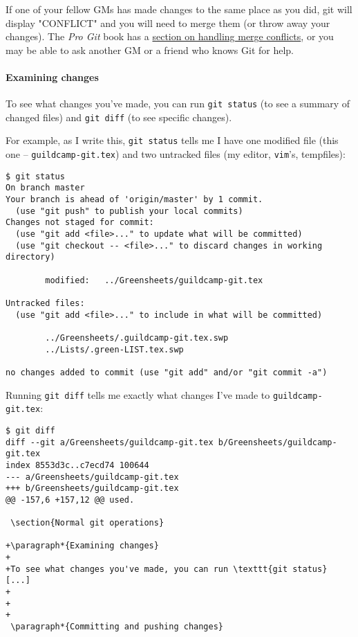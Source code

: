 \documentclass[green]{testgame}
\begin{document}
If one of your fellow GMs has made changes to the same place as you did, git will display "CONFLICT" and you will need to merge them (or throw away your changes). The \emph{Pro Git} book has a \href{https://git-scm.com/book/en/v2/Git-Branching-Basic-Branching-and-Merging#_basic_merge_conflicts}{section on handling merge conflicts}, or you may be able to ask another GM or a friend who knows Git for help.

\paragraph*{Examining changes}

To see what changes you've made, you can run \texttt{git status} (to see a summary of changed files) and \texttt{git diff} (to see specific changes).

For example, as I write this, \texttt{git status} tells me I have one modified file (this one -- \texttt{guildcamp-git.tex}) and two untracked files (my editor, \texttt{vim}'s, tempfiles):
\begin{verbatim}
$ git status
On branch master
Your branch is ahead of 'origin/master' by 1 commit.
  (use "git push" to publish your local commits)
Changes not staged for commit:
  (use "git add <file>..." to update what will be committed)
  (use "git checkout -- <file>..." to discard changes in working directory)

        modified:   ../Greensheets/guildcamp-git.tex

Untracked files:
  (use "git add <file>..." to include in what will be committed)

        ../Greensheets/.guildcamp-git.tex.swp
        ../Lists/.green-LIST.tex.swp

no changes added to commit (use "git add" and/or "git commit -a")
\end{verbatim}

Running \texttt{git diff} tells me exactly what changes I've made to \texttt{guildcamp-git.tex}:
\begin{verbatim}
$ git diff
diff --git a/Greensheets/guildcamp-git.tex b/Greensheets/guildcamp-git.tex
index 8553d3c..c7ecd74 100644
--- a/Greensheets/guildcamp-git.tex
+++ b/Greensheets/guildcamp-git.tex
@@ -157,6 +157,12 @@ used.

 \section{Normal git operations}

+\paragraph*{Examining changes}
+
+To see what changes you've made, you can run \texttt{git status} [...]
+
+
+
 \paragraph*{Committing and pushing changes}
\end{verbatim}
\end{document}
